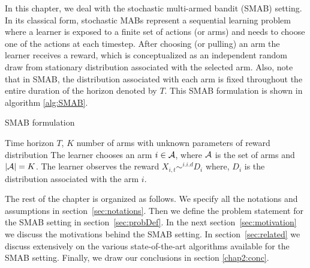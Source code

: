 In this chapter, we deal with the stochastic multi-armed bandit (SMAB) setting. In its classical form, stochastic MABs represent a sequential learning problem where a learner is exposed to a finite set of actions (or arms) and needs to choose one of the actions at each timestep. After choosing (or pulling) an arm the learner receives a reward, which is conceptualized as an independent random draw from stationary distribution associated with the selected arm. Also, note that in SMAB, the distribution associated with each arm is fixed throughout the entire duration of the horizon denoted by $T$. This SMAB formulation is shown in algorithm \ref{alg:SMAB}.

\begin{algorithm}[!th]
\caption{SMAB formulation}
\label{alg:SMAB}
\begin{algorithmic}
 Time horizon $T$, $K$ number of arms with unknown parameters of reward distribution
\State {}
\State The learner chooses an arm $i\in\mathcal{A}$, where $\mathcal{A}$ is the set of arms and $|\mathcal{A}|=K$.
\State The learner observes the reward $X_{i,t}\sim^{i.i.d} D_{i}$ where, $D_{i}$ is the distribution associated with the arm $i$. 
\State \EndFor
\end{algorithmic}
\end{algorithm}
	 
The rest of the chapter is organized as follows. We specify all the notations and assumptions in section~\ref{sec:notations}. Then we define the problem statement for the SMAB setting in section~\ref{sec:probDef}. In the next section~\ref{sec:motivation} we discuss the motivations behind the SMAB setting. In section~\ref{sec:related} we discuss extensively on the various state-of-the-art algorithms available for the SMAB setting. Finally, we draw our conclusions in section \ref{chap2:conc}.